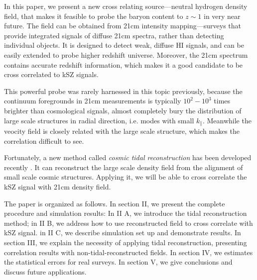 In this paper, we present a new cross relating source---neutral hydrogen density field, 
that makes it feasible to probe the baryon content to $z\sim1$ in very near future.
The field can be obtained from 21cm intensity mapping---surveys that provide integrated signals of diffuse 21cm spectra, 
rather than detecting individual objects. 
It is designed to detect weak, diffuse HI signals, and can be easily extended to probe higher redshift universe.
Moreover, the 21cm spectrum contains accurate redshift information, which makes it a good candidate to be cross correlated to kSZ signals.

This powerful probe was rarely harnessed in this topic previously, 
because the continuum foregrounds in 21cm measurements is typically $10^2 - 10^3$ times brighter than cosmological signals, almost completely bury the distribution of large scale structures in radial direction, i.e. modes with small $k_\parallel$.
Meanwhile the veocity field is closely related with the large scale structure, 
which makes the correlation difficult to see.


Fortunately, a new method called {\it cosmic tidal reconstruction} has been 
developed recently \cite{2012:pen}\cite{2015:zhu}. 
It can reconstruct the large scale density field from the alignment of small 
scale cosmic structures. Applying it, we will be able to cross correlate the kSZ signal with 21cm density field.

The paper is organized as follows. 
In section II, we present the complete procedure and simulation results: 
In II A, we introduce the tidal reconstruction method; 
in II B, we address how to use reconstructed field to cross correlate with kSZ signal. 
in II C, we describe simulation set up and demonstrate results. 
In section III, we explain the necessity of applying tidal reconstruction, 
presenting correlation results with non-tidal-reconstructed fields. 
In section IV, we estimates the statistical errors for real surveys.
In section V, we give conclusions and discuss future applications.


